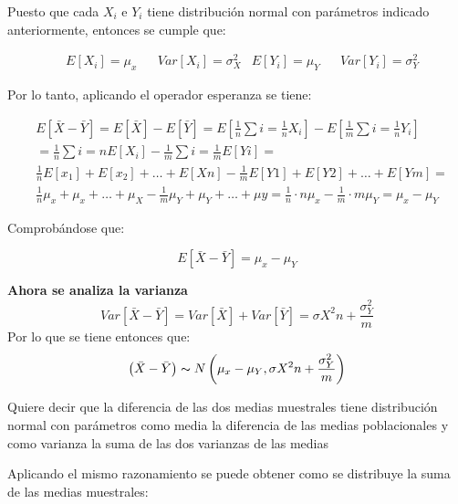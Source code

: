 Puesto que cada $X_i$ e $Y_i$ tiene distribución normal con parámetros indicado anteriormente, entonces se cumple que:

\begin{align*}
     & E\left[X_i\right] =\mu_x &  & Var\left[X_i\right]=\sigma_X^2
     & E\left[Y_i\right]=\mu_Y  &  & Var\left[Y_i\right]=\sigma_Y^2
\end{align*}

Por lo tanto, aplicando el operador esperanza se tiene:

\begin{align*}
    & E\left[ \bar{X} -\bar{Y} \right]=E \left[ \bar{X} \right]-E\left[ \bar{Y} \right]=E\left[\frac{1}{n} \sum i=\frac{1}{n}X_i\right]-E\left[\frac{1}{m} \sum i=\frac{1}{n}Y_i\right]\\
    &=\frac{1}{n} \sum i=nE\left[X_i\right]-\frac{1}{m} \sum i=\frac{1}{m}E\left[Y i\right]= \\
    & \frac{1}{n}{E\left[ x_1\right] +E\left[ x_2\right]+\dots +E \left[ Xn \right]}-\frac{1}{m}{ E\left[Y1 \right]+E \left[Y 2\right]+\dots +E \left[Ym\right]}=\\
    & \frac{1}{n}{\mu_x+\mu_x+\dots +\mu_X}-\frac{1}{m}{\mu_Y +\mu_Y+\dots +\mu  y }=\frac{1}{n}\cdot  n\mu_x-\frac{1}{m}\cdot  m\mu_Y =\mu_x-\mu_Y
\end{align*}

Comprobándose que:

\begin{equation}
    E\left[ \bar{X} -\bar{Y} \right]=\mu_x-\mu_Y
\end{equation}

\textbf{Ahora se analiza la varianza}
\begin{equation*}
    Var\left[ \bar{X} -\bar{Y} \right]=Var\left[ \bar{X} \right] +Var\left[ \bar{Y} \right]=\sigma X^2n+\frac{\sigma_Y^2}{m}
\end{equation*}
Por lo que se tiene entonces que:
\begin{equation*}
    \left( \bar{X} -\bar{Y} \right) \thicksim  N \left(  \mu_x-\mu_Y,\sigma  X^2n+\frac{\sigma_Y^2}{m} \right)
\end{equation*}

Quiere decir que la diferencia de las dos medias muestrales tiene distribución normal con parámetros como media la diferencia de las medias poblacionales y como varianza la suma de las dos varianzas de las medias


Aplicando el mismo razonamiento se puede obtener como se distribuye la suma de las medias muestrales:


